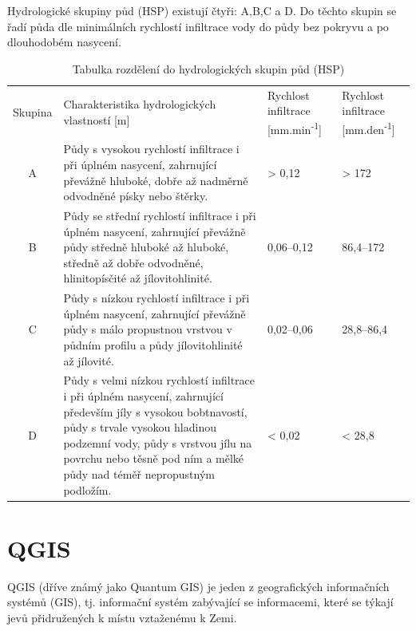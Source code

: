 \documentclass[a4paper,oneside,12pt]{book}
\begin{document}
\hspace{10mm} Hydrologické skupiny půd (HSP) existují čtyři: A,B,C a D. Do těchto skupin se řadí půda dle minimálních rychlostí infiltrace vody do půdy bez pokryvu a po dlouhodobém nasycení.\cite{MNYDGwleJOjKdRUp}
\begin{table}[htbp]
  \centering
  \caption{Tabulka rozdělení do hydrologických skupin půd (HSP) \cite{MNYDGwleJOjKdRUp}} 
  \label{tab:HSP}
  \begin{tabular}{|c|p{6cm}|p{2.5cm}|p{2.5cm}|}
    \hline
    Skupina & Charakteristika hydrologických vlastností [m] & 
    Rychlost infiltrace [mm.min\textsuperscript{-1}] & Rychlost infiltrace [mm.den\textsuperscript{-1}] \\
    \hhline{=|=|=|=|}
    A & Půdy s vysokou rychlostí infiltrace i při úplném nasycení, zahrnující převážně hluboké, dobře až nadměrně odvodněné písky nebo štěrky. & > 0,12 & > 172 \\
    \hline
    B & Půdy se střední rychlostí infiltrace i při úplném nasycení, zahrnující převážně půdy středně hluboké až hluboké, středně až dobře odvodněné, hlinitopísčité až jílovitohlinité. & 0,06–0,12 & 86,4–172 \\
    \hline
    C & Půdy s nízkou rychlostí infiltrace i při úplném nasycení, zahrnující převážně půdy s málo propustnou vrstvou v půdním profilu a půdy jílovitohlinité až jílovité. & 0,02–0,06 & 28,8–86,4 \\
    \hline
    D & Půdy s velmi nízkou rychlostí infiltrace i při úplném nasycení, zahrnující především jíly s vysokou bobtnavostí, půdy s trvale vysokou hladinou podzemní vody, půdy s vrstvou jílu na povrchu nebo těsně pod ním a mělké půdy nad téměř nepropustným podložím. & < 0,02 & < 28,8 \\
    \hline
  \end{tabular}
  
\end{table}

\newpage
\chapter{QGIS} \label{qgis}
\hspace{10mm} QGIS (dříve známý jako Quantum GIS) je jeden z geografických informačních systémů (GIS), tj.  informační systém zabývající se informacemi, které se týkají jevů přidružených k místu vztaženému k Zemi. \cite{dONaeOjXanl1W2md}
\end{document}
